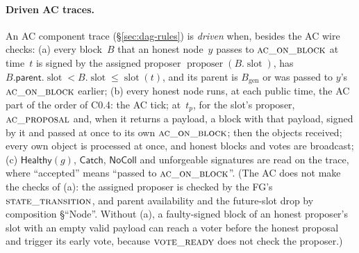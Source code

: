 \documentclass{article}
\newcommand{\genesis}{B_{\mathrm{gen}}}
\newcommand{\slot}{\operatorname{slot}}
\newcommand{\fname}[1]{\text{\textsc{#1}}}
\begin{document}
\paragraph{Driven AC traces.}  An AC component trace
(\S\ref{sec:dag-rules}) is \emph{driven} when, besides the AC wire checks:
(a) every block~$B$ that an honest node~$y$ passes to
$\fname{ac\_on\_block}$ at time~$t$ is signed by the assigned proposer
$\operatorname{proposer}(B.\slot)$, has $B.\mathsf{parent}.\slot<B.\slot\leq
\slot(t)$, and its parent is $\genesis$ or was passed to $y$'s
$\fname{ac\_on\_block}$ earlier;
(b) every honest node runs, at each public time, the AC part of the order of
C0.4: the AC tick; at~$t_p$, for the slot's proposer,
$\fname{ac\_proposal}$ and, when it returns a payload, a block with that
payload, signed by it and passed at once to its own $\fname{ac\_on\_block}$;
then the objects received; every own object is processed at once, and honest
blocks and votes are broadcast;
(c) $\mathsf{Healthy}(g)$, $\mathsf{Catch}$, $\mathsf{NoColl}$ and
unforgeable signatures are read on the trace, where ``accepted'' means
``passed to $\fname{ac\_on\_block}$''.
(The AC does not make the checks of (a): the assigned proposer is checked by
the FG's $\fname{state\_transition}$, and parent availability and the
future-slot drop by composition \S``Node''.  Without (a), a faulty-signed
block of an honest proposer's slot with an empty valid payload can reach a
voter before the honest proposal and trigger its early vote, because
$\fname{vote\_ready}$ does not check the proposer.)
\end{document}
